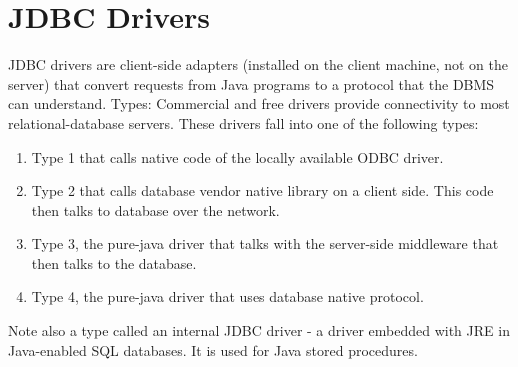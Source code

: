 \section{JDBC Drivers}
JDBC drivers are client-side adapters (installed on the client machine, not on the server) that convert requests from Java programs to a protocol that the DBMS can understand.
Types:
Commercial and free drivers provide connectivity to most relational-database servers. These drivers fall into one of the following types:
\begin{enumerate}
\item{Type 1 that calls native code of the locally available ODBC driver. }
\item{Type 2 that calls database vendor native library on a client side. This code then talks to database over the network.}
\item{Type 3, the pure-java driver that talks with the server-side middleware that then talks to the database.}
\item{Type 4, the pure-java driver that uses database native protocol.}\\
\end{enumerate}
Note also a type called an internal JDBC driver - a driver embedded with JRE in Java-enabled SQL databases. It is used for Java stored procedures.\\


